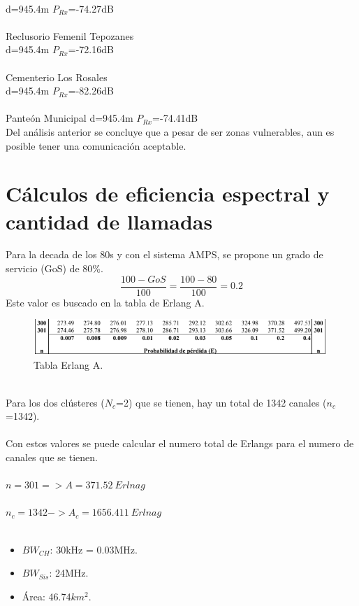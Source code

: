 \documentclass[11pt,letterpaper]{article}
\begin{document}
\\
d=945.4m \quad $P_{Rx}$=-74.27dB
\\ \\
Reclusorio Femenil Tepozanes
\\
d=945.4m \quad $P_{Rx}$=-72.16dB
\\ \\
Cementerio Los Rosales
\\
d=945.4m \quad $P_{Rx}$=-82.26dB
\\ \\
Panteón Municipal \quad d=945.4m \quad $P_{Rx}$=-74.41dB
\\
Del análisis anterior se concluye que a pesar de ser zonas vulnerables, aun es posible 
tener una comunicación aceptable.

\section{Cálculos de eficiencia espectral y cantidad de llamadas}
Para la decada de los 80s y con el sistema AMPS, se propone un grado de servicio (GoS) de 
80\%.
\begin{equation}
    \frac{100-GoS}{100}=\frac{100-80}{100}=0.2
\end{equation}
Este valor es buscado en la tabla de Erlang A.
\begin{figure}[ht]
    \centering
    \includegraphics[width=0.99\textwidth]{imagenes/t24.png}
    \caption{Tabla Erlang A.}
\end{figure}
\\
Para los dos clústeres ($N_c$=2) que se tienen, hay un total de 1342 canales ($n_c$=1342).
\\ \\
Con estos valores se puede calcular el numero total de Erlangs para el numero de canales que se 
tienen.
\\ \\
$n=301 => A=371.52 \ Erlnag$
\\ \\
$n_c=1342->A_c=1656.411 \ Erlnag$
\\ \\
\begin{itemize}
    \item $BW_{CH}$: 30kHz = 0.03MHz.
    \item $BW_{Sis}$: 24MHz.
    \item Área: 46.74$km^2$.
\end{itemize}
\end{document}
